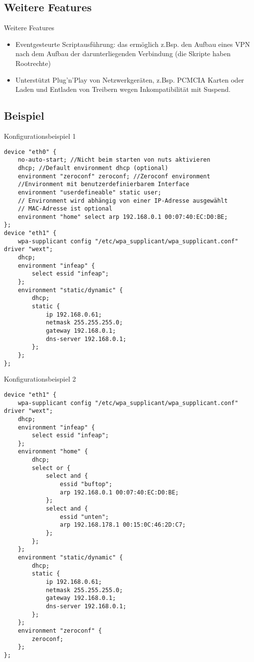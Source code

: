 \subsection{Weitere Features}
\begin{frame}[<+-|alert@+>]{Weitere Features}
	\begin{itemize}
		\item Eventgesteurte Scriptausführung: das ermöglich z.Bsp. den Aufbau eines VPN nach dem Aufbau der darunterliegenden Verbindung (die Skripte haben Rootrechte)
		\item Unterstützt Plug'n'Play von Netzwerkgeräten, z.Bsp. PCMCIA Karten oder Laden und Entladen von Treibern wegen Inkompatibilität mit Suspend.
	\end{itemize}
\end{frame}

\subsection{Beispiel}
\begin{frame}[fragile]{Konfigurationsbeispiel 1}
\tiny
\begin{verbatim}
device "eth0" {
    no-auto-start; //Nicht beim starten von nuts aktivieren
    dhcp; //Default environment dhcp (optional)
    environment "zeroconf" zeroconf; //Zeroconf environment
    //Environment mit benutzerdefinierbarem Interface
    environment "userdefineable" static user;
    // Environment wird abhängig von einer IP-Adresse ausgewählt
    // MAC-Adresse ist optional
    environment "home" select arp 192.168.0.1 00:07:40:EC:D0:BE;
};
device "eth1" {
    wpa-supplicant config "/etc/wpa_supplicant/wpa_supplicant.conf" driver "wext";
    dhcp;
    environment "infeap" {
        select essid "infeap";
    };
    environment "static/dynamic" {
        dhcp;
        static {
            ip 192.168.0.61;
            netmask 255.255.255.0;
            gateway 192.168.0.1;
            dns-server 192.168.0.1;
        };
    };
};
\end{verbatim}
\end{frame}

\begin{frame}[fragile]{Konfigurationsbeispiel 2}
\fontsize{4.8}{5.8} \selectfont
\begin{verbatim}
device "eth1" {
    wpa-supplicant config "/etc/wpa_supplicant/wpa_supplicant.conf" driver "wext";
    dhcp;
    environment "infeap" {
        select essid "infeap";
    };
    environment "home" {
        dhcp;
        select or {
            select and {
                essid "buftop";
                arp 192.168.0.1 00:07:40:EC:D0:BE;
            };
            select and {
                essid "unten";
                arp 192.168.178.1 00:15:0C:46:2D:C7;
            };
        };
    };
    environment "static/dynamic" {
        dhcp;
        static {
            ip 192.168.0.61;
            netmask 255.255.255.0;
            gateway 192.168.0.1;
            dns-server 192.168.0.1;
        };
    };
    environment "zeroconf" {
        zeroconf;
    };
};
\end{verbatim}
\end{frame}
